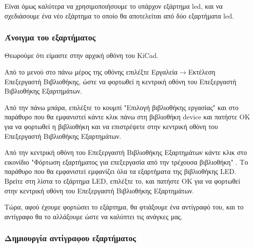\documentclass[a4paper]{article}
\begin{document}
Είναι όμως καλύτερα να χρησιμοποιήσουμε το υπάρχον εξάρτημα led, και να σχεδιάσουμε ένα νέο εξάρτημα το οποίο θα αποτελείται από δύο εξαρτήματα led.

\subsubsection{Άνοιγμα του εξαρτήματος}
Θεωρούμε ότι είμαστε στην αρχική οθόνη του KiCad. 

Από το μενού στο πάνω μέρος της οθόνης επιλέξτε Εργαλεία$\rightarrow$Εκτέλεση Επεξεργαστή Βιβλιοθήκης, ώστε να φορτωθεί η κεντρική οθόνη του Επεξεργαστή Βιβλιοθήκης Εξαρτημάτων.

\begin{figure}
  \begin{center}
    \label{fig:kicad-main}
  \end{center}
\end{figure}

Από την πάνω μπάρα, επιλέξτε το κουμπί "Επιλογή βιβλιοθήκης εργασίας" και στο παράθυρο που θα εμφανιστεί κάντε κλικ πάνω στη βιβλιοθήκη device και πατήστε ΟΚ για να φορτωθεί η βιβλιοθήκη και να επιστρέψετε στην κεντρική οθόνη του Επεξεργαστή Βιβλιοθήκης Εξαρτημάτων.

Από την κεντρική οθόνη του Επεξεργαστή Βιβλιοθήκης Εξαρτημάτων κάντε κλικ στο εικονίδιο "Φόρτωση εξαρτήματος για επεξεργασία από την τρέχουσα βιβλιοθήκη" %
. Το παράθυρο που θα εμφανιστεί εμφανίζει όλα τα εξαρτήματα της βιβλιοθήκης LED. Βρείτε στη λίστα το εξάρτημα LED, επιλέξτε το, και πατήστε ΟΚ για να φορτωθεί στην κεντρική οθόνη του Επεξεργαστή Βιβλιοθήκης Εξαρτημάτων.

\begin{figure}
  \begin{center}
    \label{fig:kicad-main}
  \end{center}
\end{figure}

Τώρα, αφού έχουμε φορτώσει το εξάρτημα, θα φτιάξουμε ένα αντίγραφό του, και το αντίγραφο θα το αλλάξουμε ώστε να καλύπτει τις ανάγκες μας.

\subsubsection{Δημιουργία αντίγραφου εξαρτήματος}
\end{document}
